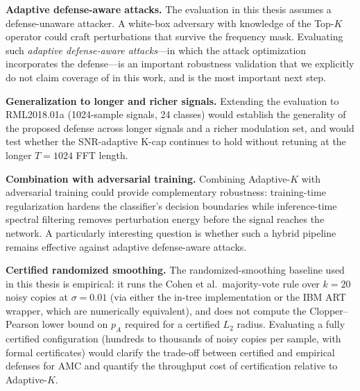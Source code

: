 \textbf{Adaptive defense-aware attacks.}
The evaluation in this thesis assumes a defense-unaware attacker. A
white-box adversary with knowledge of the Top-$K$ operator could craft
perturbations that survive the frequency mask. Evaluating such
\emph{adaptive defense-aware attacks}---in which the attack optimization
incorporates the defense---is an important robustness validation that we
explicitly do not claim coverage of in this work, and is the most
important next step.

\textbf{Generalization to longer and richer signals.}
Extending the evaluation to RML2018.01a (1024-sample signals, 24 classes)
would establish the generality of the proposed defense across longer
signals and a richer modulation set, and would test whether the
SNR-adaptive K-cap continues to hold without retuning at the longer
$T = 1024$ FFT length.

\textbf{Combination with adversarial training.}
Combining Adaptive-$K$ with adversarial training could provide
complementary robustness: training-time regularization hardens the
classifier's decision boundaries while inference-time spectral filtering
removes perturbation energy before the signal reaches the network. A
particularly interesting question is whether such a hybrid pipeline
remains effective against adaptive defense-aware attacks.

\textbf{Certified randomized smoothing.}
The randomized-smoothing baseline used in this thesis is empirical:
it runs the Cohen et al.\ majority-vote rule over $k = 20$ noisy
copies at $\sigma = 0.01$ (via either the in-tree implementation or
the IBM ART~\cite{art2018} wrapper, which are numerically
equivalent), and does not compute the Clopper--Pearson lower bound on
$p_A$ required for a certified $L_2$ radius. Evaluating
a fully certified configuration (hundreds to thousands of noisy copies
per sample, with formal certificates) would clarify the trade-off
between certified and empirical defenses for AMC and quantify the
throughput cost of certification relative to Adaptive-$K$.
